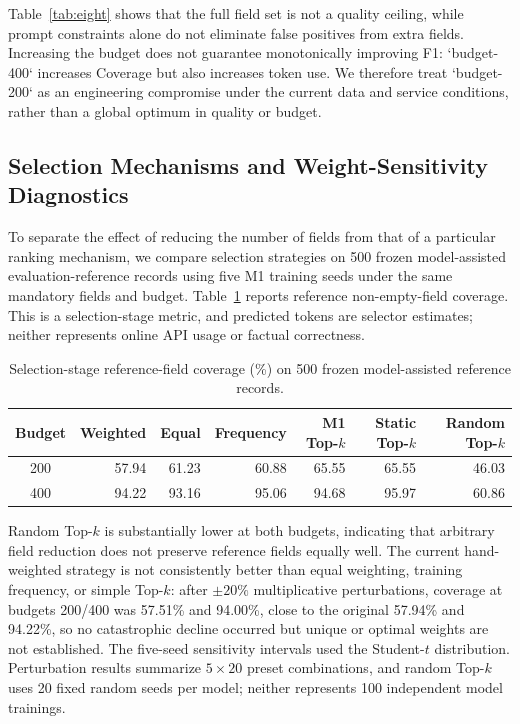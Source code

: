 \documentclass[runningheads]{llncs}
\newcommand{\method}{M1}
\begin{document}
Table~\ref{tab:eight} shows that the full field set is not a quality ceiling, while prompt constraints alone do not eliminate false positives from extra fields. Increasing the budget does not guarantee monotonically improving F1: `budget-400` increases Coverage but also increases token use. We therefore treat `budget-200` as an engineering compromise under the current data and service conditions, rather than a global optimum in quality or budget.

\subsection{Selection Mechanisms and Weight-Sensitivity Diagnostics}

To separate the effect of reducing the number of fields from that of a particular ranking mechanism, we compare selection strategies on 500 frozen model-assisted evaluation-reference records using five \method{} training seeds under the same mandatory fields and budget. Table~\ref{tab:selection-ablation} reports reference non-empty-field coverage. This is a selection-stage metric, and predicted tokens are selector estimates; neither represents online API usage or factual correctness.

\begin{table}[htbp]\centering\scriptsize\setlength{\tabcolsep}{3pt}
\caption{Selection-stage reference-field coverage (\%) on 500 frozen model-assisted reference records.}\label{tab:selection-ablation}
\begin{tabular}{@{}crrrrrr@{}}\toprule
Budget & Weighted & Equal & Frequency & \method{} Top-$k$ & Static Top-$k$ & Random Top-$k$\\\midrule
200 & 57.94 & 61.23 & 60.88 & 65.55 & 65.55 & 46.03\\
400 & 94.22 & 93.16 & 95.06 & 94.68 & 95.97 & 60.86\\\bottomrule
\end{tabular}\end{table}

Random Top-$k$ is substantially lower at both budgets, indicating that arbitrary field reduction does not preserve reference fields equally well. The current hand-weighted strategy is not consistently better than equal weighting, training frequency, or simple Top-$k$: after $\pm20\%$ multiplicative perturbations, coverage at budgets 200/400 was 57.51\% and 94.00\%, close to the original 57.94\% and 94.22\%, so no catastrophic decline occurred but unique or optimal weights are not established. The five-seed sensitivity intervals used the Student-$t$ distribution. Perturbation results summarize $5\times20$ preset combinations, and random Top-$k$ uses 20 fixed random seeds per model; neither represents 100 independent model trainings.
\end{document}
